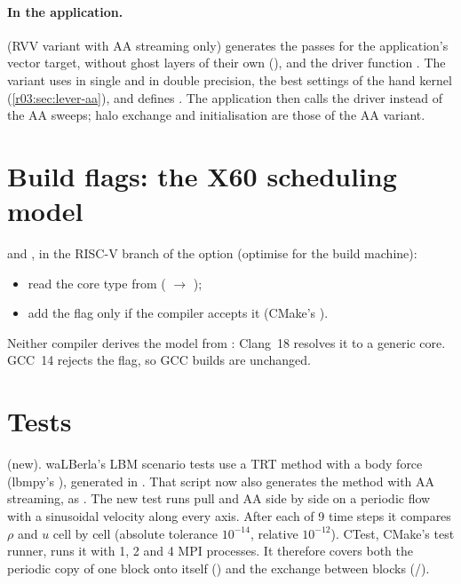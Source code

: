 \paragraph{In the application.}  (RVV variant with AA
streaming only) generates the passes for the application's vector target, without ghost layers
of their own (), and the driver function .
The variant  uses  in single and  in double
precision, the best settings of the hand kernel (\cref{r03:sec:lever-aa}), and defines
. The application then calls the driver instead of the AA sweeps; halo
exchange and initialisation are those of the AA variant.

\section{Build flags: the X60 scheduling model}\label{r03:sec:wl-cmake}

 and , in the RISC-V
branch of the option  (optimise for the build machine):
\begin{itemize}
  \item read the core type from  (
        $\rightarrow$ );
  \item add the flag only if the compiler accepts it (CMake's ).
\end{itemize}
Neither compiler derives the model from : Clang~18 resolves it to a generic
core. GCC~14 rejects the flag, so GCC builds are unchanged.

\section{Tests}\label{r03:sec:wl-tests}

 (new). waLBerla's LBM scenario tests use a
TRT method with a body force (lbmpy's ), generated in
. That script now also generates the method
with AA streaming, as . The new test runs pull and AA side by side on a periodic flow
with a sinusoidal velocity along every axis. After each of 9 time steps it compares $\rho$ and
$u$ cell by cell (absolute tolerance $10^{-14}$, relative $10^{-12}$). CTest, CMake's test runner,
runs it with 1, 2 and 4 MPI processes. It therefore covers both the periodic copy of one block
onto itself () and the exchange between blocks (/).

